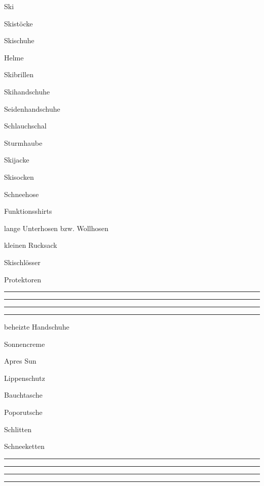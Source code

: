 \begin{VIERitemize}
    \item{Ski}
    \item{Skistöcke}
    \item{Skischuhe}
    \item{Helme}
    \item{Skibrillen}
    \item{Skihandschuhe}
    \item{Seidenhandschuhe}
    \item{Schlauchschal}
    \item{Sturmhaube}
    \item{Skijacke}
    \item{Skisocken}
    \item{Schneehose}
    \item{Funktionsshirts}
    \item{lange Unterhosen bzw. Wollhosen}
    \item{kleinen Rucksack}
    \item{Skischlösser}
    \item{Protektoren}
    \item{\rule{50mm}{0.4pt}}
    \item{\rule{50mm}{0.4pt}}
    \item{\rule{50mm}{0.4pt}}
    \item{\rule{50mm}{0.4pt}}
\end{VIERitemize}

\begin{ONEitemize}
    \item{beheizte Handschuhe}
    \item{Sonnencreme}
    \item{Apres Sun}
    \item{Lippenschutz}
    \item{Bauchtasche}
    \item{Poporutsche}
    \item{Schlitten}
    \item{Schneeketten}
    \item{\rule{50mm}{0.4pt}}
    \item{\rule{50mm}{0.4pt}}
    \item{\rule{50mm}{0.4pt}}
    \item{\rule{50mm}{0.4pt}}
\end{ONEitemize}

